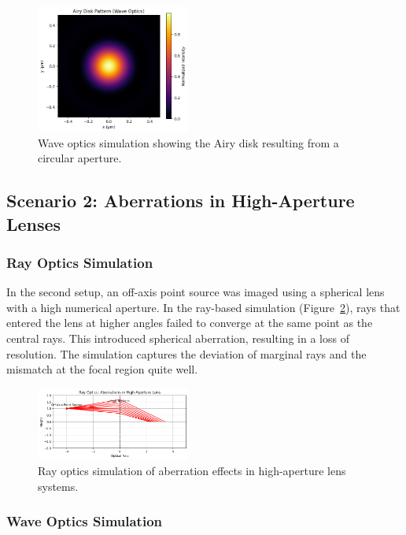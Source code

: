\begin{multicols}{2}
\begin{figure}[H]
    \centering
    \includegraphics[width=0.45\textwidth]{../images/wave_optics_airy_disk.png}
    \caption{Wave optics simulation showing the Airy disk resulting from a circular aperture.}
    \label{fig:wave-diffraction}
\end{figure}

\subsection{Scenario 2: Aberrations in High-Aperture Lenses}

\subsubsection{Ray Optics Simulation}

In the second setup, an off-axis point source was imaged using a spherical lens with a high numerical aperture.
In the ray-based simulation (Figure~\ref{fig:ray-aberration}), rays that entered the lens at higher angles failed to converge at the same point as the central rays. This introduced spherical aberration,
resulting in a loss of resolution. The simulation captures the deviation of marginal rays and the mismatch at the focal region quite well.

\begin{figure}[H]
    \centering
    \includegraphics[width=0.45\textwidth]{../images/ray_optics_aberration.png}
    \caption{Ray optics simulation of aberration effects in high-aperture lens systems.}
    \label{fig:ray-aberration}
\end{figure}

\subsubsection{Wave Optics Simulation}


\end{multicols}
